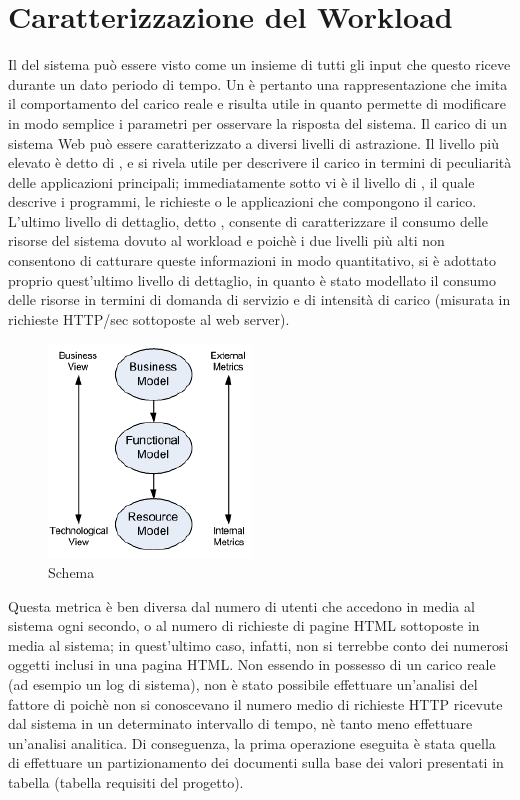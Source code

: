 \chapter{Caratterizzazione del Workload}
Il  del sistema può essere visto come un insieme di tutti gli input che questo riceve durante un dato periodo di tempo. Un  è pertanto una rappresentazione che imita il comportamento del carico reale e risulta utile in quanto permette di modificare in modo semplice i parametri per osservare la risposta del sistema. Il carico di un sistema Web può essere caratterizzato a diversi livelli di astrazione. Il livello più elevato è detto di , e si rivela utile per descrivere il carico in termini di peculiarità delle applicazioni principali; immediatamente sotto vi è il livello di , il quale descrive i programmi, le richieste o le applicazioni che compongono il carico. L'ultimo livello di dettaglio, detto , consente di caratterizzare il consumo delle risorse del sistema dovuto al workload e poichè i due livelli più alti non consentono di catturare queste informazioni in modo quantitativo, si è adottato proprio quest'ultimo livello di dettaglio, in quanto è stato modellato il consumo delle risorse in termini di domanda di servizio e di intensità di carico (misurata in richieste HTTP/sec sottoposte al web server). 
\begin{figure}[H]
\begin{center}
\includegraphics[scale=1.2]{etc/schema3.png}
\caption{Schema}
\label{schema3}
\end{center}
\end{figure}
Questa metrica è ben diversa dal numero di utenti che accedono in media al sistema ogni secondo, o al numero di richieste di pagine HTML sottoposte in media al sistema; in quest'ultimo caso, infatti, non si terrebbe conto dei numerosi oggetti inclusi in una pagina HTML. 
Non essendo in possesso di un carico reale (ad esempio un log di sistema), non è stato possibile effettuare un'analisi del fattore di  poichè non si conoscevano il numero medio di richieste HTTP ricevute dal sistema in un determinato intervallo di tempo, nè tanto meno effettuare un'analisi analitica. Di conseguenza, la prima operazione eseguita è stata quella di effettuare un partizionamento dei documenti sulla base dei valori presentati in tabella (tabella requisiti del progetto). 
